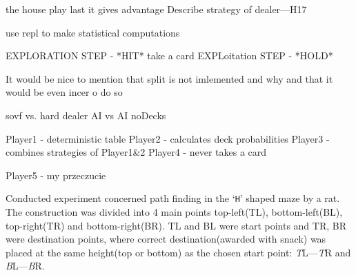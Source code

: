 \documentclass[12pt,a4paper,twocolumn]{article}
\begin{document}
the house play last it gives advantage
Describe strategy of dealer---H17


use repl to make statistical computations


EXPLORATION STEP  -  *HIT* take a card
EXPLoitation STEP - *HOLD* 


It would be nice to mention that split is not imlemented and why and that it would be even incer o do so

sovf vs. hard dealer
AI vs AI
noDecks

Player1 - deterministic table
Player2 - calculates deck probabilities
Player3 - combines strategies of Player1\&2
Player4 - never takes a card

Player5 - my przeczucie



Conducted experiment concerned path finding in the `\texttt{H}' shaped maze by a rat. The construction was divided into 4 main points top-left(TL), bottom-left(BL), top-right(TR) and bottom-right(BR). TL and BL were start points and TR, BR were destination points, where correct destination(awarded with snack) was placed at the same height(top or bottom) as the chosen start point: \emph{T}L---\emph{T}R and \emph{B}L---\emph{B}R.\\

\end{document}
